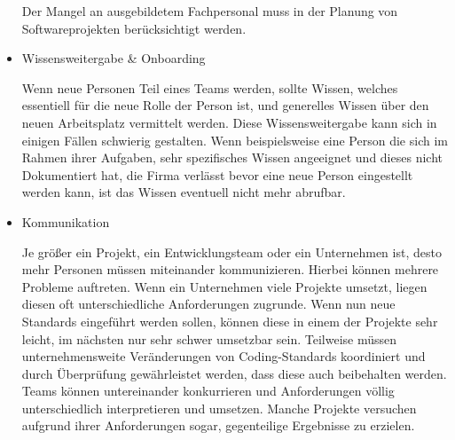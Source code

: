 \documentclass[acmtog, language=ngerman]{acmart}
\begin{document}
\begin{itemize}
Der Mangel an ausgebildetem Fachpersonal muss in der Planung von Softwareprojekten berücksichtigt werden.

\item Wissensweitergabe \& Onboarding

Wenn neue Personen Teil eines Teams werden, sollte Wissen, welches essentiell für die neue Rolle der Person ist, und generelles Wissen über den neuen Arbeitsplatz vermittelt werden. Diese Wissensweitergabe kann sich in einigen Fällen schwierig gestalten. Wenn beispielsweise eine Person die sich im Rahmen ihrer Aufgaben, sehr spezifisches Wissen angeeignet und dieses nicht Dokumentiert hat, die Firma verlässt bevor eine neue Person eingestellt werden kann, ist das Wissen eventuell nicht mehr abrufbar.

\item Kommunikation

Je größer ein Projekt, ein Entwicklungsteam oder ein Unternehmen ist, desto mehr Personen müssen miteinander kommunizieren. Hierbei können mehrere Probleme auftreten.
Wenn ein Unternehmen viele Projekte umsetzt, liegen diesen oft unterschiedliche Anforderungen zugrunde. Wenn nun neue Standards eingeführt werden sollen, können diese in einem der Projekte sehr leicht, im nächsten nur sehr schwer umsetzbar sein. 
Teilweise müssen unternehmensweite Veränderungen von Coding-Standards koordiniert und durch Überprüfung gewährleistet werden, dass diese auch beibehalten werden. Teams können untereinander konkurrieren und Anforderungen völlig unterschiedlich interpretieren und umsetzen. Manche Projekte versuchen aufgrund ihrer Anforderungen sogar, gegenteilige Ergebnisse zu erzielen. 
\end{itemize}
\end{document}

